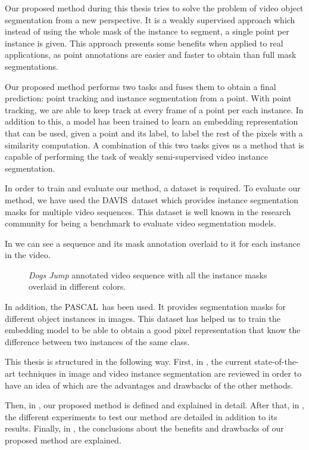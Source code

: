 Our proposed method during this thesis tries to solve the problem of video object segmentation from a new perspective.
It is a weakly supervised approach which instead of using the whole mask of the instance to segment, a single point per instance is given.
This approach presents some benefits when applied to real applications, as point annotations are easier and faster to obtain than full mask segmentations.


Our proposed method performs two tasks and fuses them to obtain a final prediction: point tracking and instance segmentation from a point.
With point tracking, we are able to keep track at every frame of a point per each instance.
In addition to this, a model has been trained to learn an embedding representation that can be used, given a point and its label, to label the rest of the pixels with a similarity computation.
A combination of this two tasks gives us a method that is capable of performing the task of weakly semi-supervised video instance segmentation.

In order to train and evaluate our method, a dataset is required.
To evaluate our method, we have used the DAVIS~\davisboth dataset which provides instance segmentation masks for multiple video sequences.
This dataset is well known in the research community for being a benchmark to evaluate video segmentation models.

In  we can see a sequence and its mask annotation overlaid to it for each instance in the video.

\begin{figure}[h]
  \centering
  \caption{\textit{Dogs Jump} annotated video sequence with all the instance masks overlaid in different colors. }
  \label{fig:intro:davis}
\end{figure}

In addition, the PASCAL~\pascal has been used.
It provides segmentation masks for different object instances in images.
This dataset has helped us to train the embedding model to be able to obtain a good pixel representation that know the difference between two instances of the same class.

This thesis is structured in the following way. First, in , the current state-of-the-art techniques in image and video instance segmentation are reviewed in order to have an idea of which are the advantages and drawbacks of the other methods.

Then, in , our proposed method is defined and explained in detail.
After that, in , the different experiments to test our method are detailed in addition to its results.
Finally, in , the conclusions about the benefits and drawbacks of our proposed method are explained.
